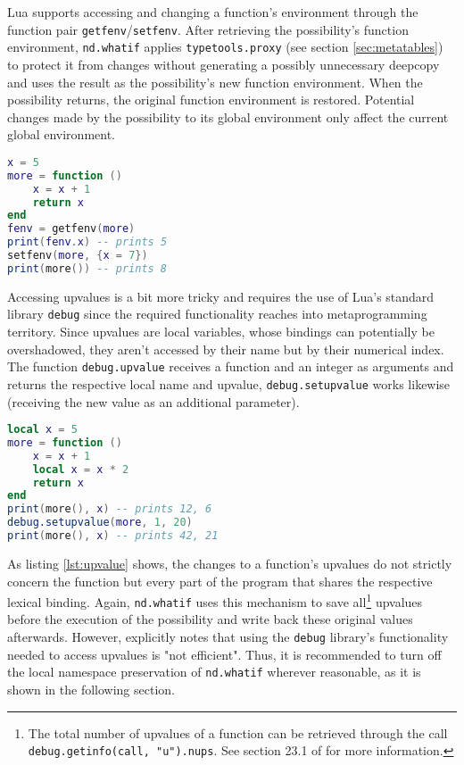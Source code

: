 Lua supports accessing and changing a function's environment through the function pair \texttt{getfenv}/\texttt{setfenv}. After retrieving the possibility's function environment, \texttt{nd.whatif} applies \texttt{typetools.proxy} (see section \ref{sec:metatables}) to protect it from changes without generating a possibly unnecessary deepcopy and uses the result as the possibility's new function environment. When the possibility returns, the original function environment is restored. Potential changes made by the possibility to its global environment only affect the current global environment.

\begin{lstlisting}[language=lua, caption={Changing a function's environment.}, label=lst:fenv, name=lst:fenv]
x = 5
more = function ()
	x = x + 1
	return x
end
fenv = getfenv(more)
print(fenv.x) -- prints 5
setfenv(more, {x = 7})
print(more()) -- prints 8
\end{lstlisting}

Accessing upvalues is a bit more tricky and requires the use of Lua's standard library \texttt{debug} since the required functionality reaches into metaprogramming territory. Since upvalues are local variables, whose bindings can potentially be overshadowed, they aren't accessed by their name but by their numerical index. The function \texttt{debug.upvalue} receives a function and an integer as arguments and returns the respective local name and upvalue, \texttt{debug.setupvalue} works likewise (receiving the new value as an additional parameter).

\begin{lstlisting}[language=lua, caption={Setting a function's upvalue "from the outside".}, label=lst:upvalue, name=lst:upvalue]
local x = 5
more = function ()
	x = x + 1
	local x = x * 2
	return x
end
print(more(), x) -- prints 12, 6
debug.setupvalue(more, 1, 20)
print(more(), x) -- prints 42, 21
\end{lstlisting}

As listing \ref{lst:upvalue} shows, the changes to a function's upvalues do not strictly concern the function but every part of the program that shares the respective lexical binding. Again, \texttt{nd.whatif} uses this mechanism to save all\footnote{The total number of upvalues of a function can be retrieved through the call \texttt{debug.getinfo(call, "u").nups}. See section 23.1 of \cite{Ierusalimschy2006} for more information.} upvalues before the execution of the possibility and write back these original values afterwards. However, \cite{Ierusalimschy2006} explicitly notes that using the \texttt{debug} library's functionality needed to access upvalues is "not efficient". Thus, it is recommended to turn off the local namespace preservation of \texttt{nd.whatif} wherever reasonable, as it is shown in the following section.

